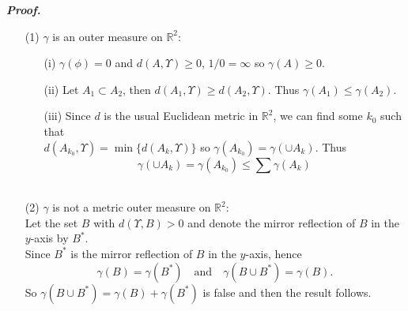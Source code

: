 \documentclass[a4paper,11pt]{article}
\begin{document}
\begin{enumerate}
		\textit{\textbf {Proof.}}\\
			\begin{enumerate}
				\item[(1)] $\gamma$ is an outer measure on $\mathbb{R}^2$:
					\begin{enumerate}
						\item[(i)] $\gamma(\phi) = 0$ and $d(A,\Upsilon) \geq 0$, $1/0 = \infty$ so $\gamma(A) \geq 0$.\\

						\item[(ii)] Let $A_1 \subset A_2$, then $d(A_1,\Upsilon) \geq d(A_2,\Upsilon)$. Thus $\gamma(A_1) \leq \gamma(A_2)$.\\

						\item[(iii)] Since $d$ is the usual Euclidean metric in $\mathbb{R}^2$, we can find some $k_0$ such that\\
						$d(A_{k_0},\Upsilon) = \min \{d(A_k,\Upsilon)\}$ so $\gamma(A_{k_0}) = \gamma(\cup A_k)$. Thus
							$$\gamma(\cup A_k)
							= \gamma(A_{k_0})
							\leq \sum \gamma(A_k)$$\
					\end{enumerate}

				\item[(2)] $\gamma$ is not a metric outer measure on $\mathbb{R}^2$:\\
				Let the set $B$ with $d(\Upsilon,B) > 0$ and denote the mirror reflection of $B$ in the $y$-axis by $B^*$.\\
				Since $B^*$ is the mirror reflection of $B$ in the $y$-axis, hence
					$$\gamma(B) = \gamma(B^*)
					\quad \text{and} \quad
					\gamma(B \cup B^*) = \gamma(B).$$
				So $\gamma(B \cup B^*) = \gamma(B) + \gamma(B^*)$ is false and then the result follows.\
			\end{enumerate}
	\end{enumerate}
\end{document}
